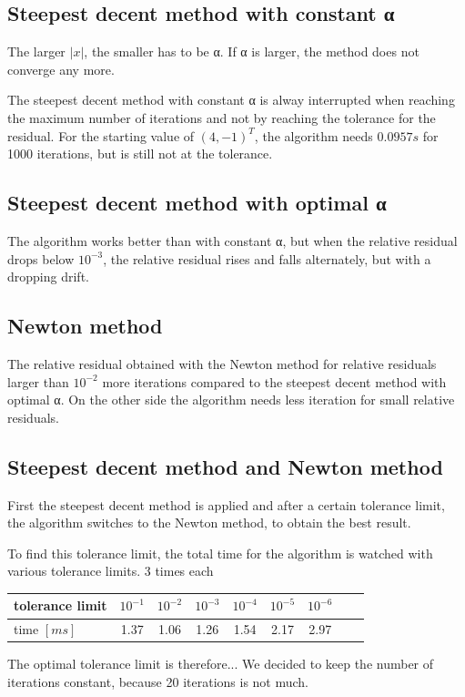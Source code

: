 \documentclass[a4paper,12pt]{article}
\begin{document}
\subsection{Steepest decent method with constant α}
The larger $|x|$, the smaller has to be α. %
If α is larger, the method does not converge any more.

The steepest decent method with constant α is alway interrupted when reaching the maximum number of iterations and not by reaching the tolerance for the residual.
For the starting value of $(4,-1)^T$, the algorithm needs $0.0957s$ for 1000 iterations, but is still not at the tolerance.


\subsection{Steepest decent method with optimal α}
The algorithm works better than with constant α, but when the relative residual drops below $10^{-3}$, the relative residual rises and falls alternately, but with a dropping drift.

\subsection{Newton method}
The relative residual obtained with the Newton method for relative residuals larger than $10^{-2}$ more iterations compared to the steepest decent method with optimal α.
On the other side the algorithm needs less iteration for small relative residuals.

\subsection{Steepest decent method and Newton method}
First the steepest decent method is applied and after a certain tolerance limit, the algorithm switches to the Newton method, to obtain the best result.

To find this tolerance limit, the total time for the algorithm is watched with various tolerance limits.
3 times each
\begin{tabular}{l|c|c|c|c|c|c|c|c}
tolerance limit & $10^{-1}$& $10^{-2}$& $10^{-3}$& $10^{-4}$& $10^{-5}$& $10^{-6}$\\\hline
time $[ms]$		& 1.37&1.06&1.26&1.54&2.17&2.97
\end{tabular}

The optimal tolerance limit is therefore...
We decided to keep the number of iterations constant, because 20 iterations is not much. 
\end{document}

